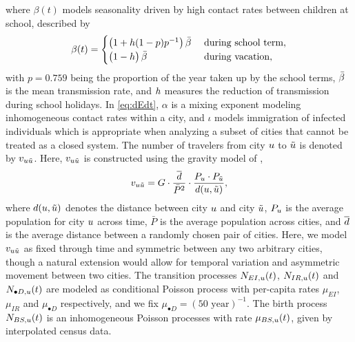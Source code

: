 \documentclass[12pt]{article}\usepackage[]{graphicx}\usepackage[]{xcolor}
\begin{document}
where $\beta(t)$ models seasonality driven by high contact rates between children at school, described by
\begin{equation}
\nonumber
  \beta(t)=\begin{cases}
\big(1+h(1-p)p^{-1} \big)\, {\bar\beta} & \mbox{ during school term},\\
\big( 1-h\big) \, {\bar\beta}& \mbox{ during vacation},
  \end{cases} \label{eq:term}
\end{equation}
with $p = 0.759$ being the proportion of the year taken up by the school terms, ${\bar\beta}$ is the mean transmission rate, and $h$ measures the reduction of transmission during school holidays.
In \eqref{eq:dEdt}, $\alpha$ is a mixing exponent modeling inhomogeneous contact rates within a city, and $\iota$ models immigration of infected individuals which is appropriate when analyzing a subset of cities that cannot be treated as a closed system.
The number of travelers from city $u$ to $\tilde u$ is denoted by $v_{u\tilde u}$. 
Here, $v_{u\tilde u}$ is constructed using the gravity model of \cite{xia04}, 
\[
v_{u\tilde u} = G \cdot \frac{\;\overline{d}\;}{\bar{P}^2} \cdot \frac{P_u \cdot P_{\tilde u}}{d(u,\tilde u)},
\]
where $d(u,\tilde u)$ denotes the distance between city $u$ and city $\tilde u$, $P_u$ is the average population for city $u$ across time, $\bar{P}$ is the average population across cities, and $\overline{d}$ is the average distance between a randomly chosen pair of cities.
Here, we model $v_{u\tilde u}$ as fixed through time and symmetric between any two arbitrary cities, though a natural extension would allow for temporal variation and asymmetric movement between two cities.
The transition processes $N_{EI,u}(t)$, $N_{IR,u}(t)$ and $N_{\bullet D,u}(t)$ are modeled as conditional Poisson process with per-capita rates $\mu_{EI}$, $\mu_{IR}$ and $\mu_{\bullet D}$ respectively, and we fix $\mu_{\bullet D}=(50 \mbox{ year})^{-1}$.
The birth process $N_{BS,u}(t)$ is an inhomogeneous Poisson processes with rate $\mu_{BS,u}(t)$, given by interpolated census data.
\end{document}
